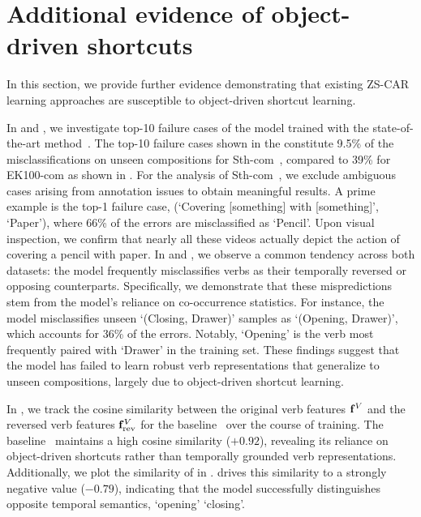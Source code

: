 


\section{Additional evidence of object-driven shortcuts}
\label{sec:additional_evidence}
In this section, we provide further evidence demonstrating that existing ZS-CAR learning approaches are susceptible to object-driven shortcut learning.

In  and , we investigate top-10 failure cases of the model trained with the state-of-the-art method~\cite{li2024c2c}. 
The top-10 failure cases shown in the  constitute 9.5\% of the misclassifications on unseen compositions for Sth-com~\cite{li2024c2c}, compared to 39\% for EK100-com as shown in .
For the analysis of Sth-com~\cite{li2024c2c}, we exclude ambiguous cases arising from annotation issues to obtain meaningful results. 
A prime example is the top-1 failure case, (`Covering [something] with [something]', `Paper'), where 66\% of the errors are misclassified as `Pencil'. 
Upon visual inspection, we confirm that nearly all these videos actually depict the action of covering a pencil with paper.
In  and , we observe a common tendency across both datasets: the model frequently misclassifies verbs as their temporally reversed or opposing counterparts. 
Specifically, we demonstrate that these mispredictions stem from the model's reliance on co-occurrence statistics.
For instance, the model misclassifies unseen `(Closing, Drawer)' samples as `(Opening, Drawer)', which accounts for 36\% of the errors.
Notably, `Opening' is the verb most frequently paired with `Drawer' in the training set. 
These findings suggest that the model has failed to learn robust verb representations that generalize to unseen compositions, largely due to object-driven shortcut learning.



In , we track the cosine similarity between the original verb features $\mathbf{f}^V$ and the reversed verb features $\mathbf{f}^V_{\text{rev}}$ for the baseline~\cite{li2024c2c} over the course of training.
The baseline~\cite{li2024c2c} maintains a high cosine similarity ($+0.92$), revealing its reliance on object-driven shortcuts rather than temporally grounded verb representations.
Additionally, we plot the similarity of \ours{} in .
\ours{} drives this similarity to a strongly negative value ($-0.79$), indicating that the model successfully distinguishes opposite temporal semantics, \eg `opening' \vs `closing'.


